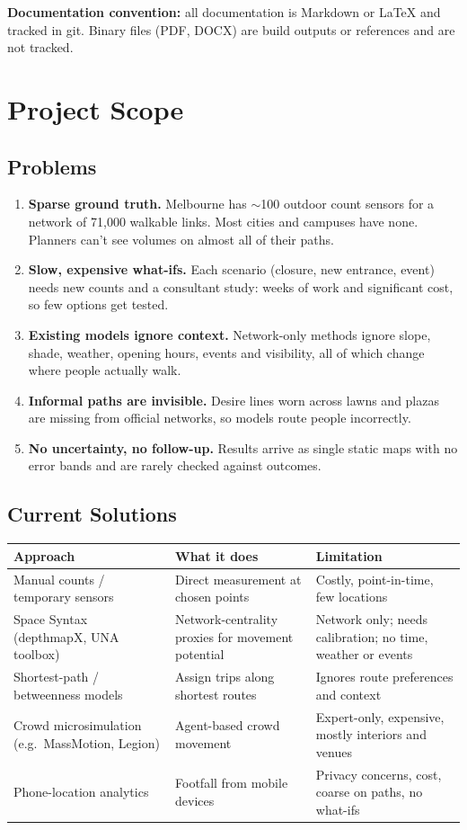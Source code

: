 \documentclass[11pt]{article}
\newcommand{\hrow}{\rowcolor{headgray}}
\begin{document}
\textbf{Documentation convention:} all documentation is Markdown or LaTeX and tracked in git. Binary files (PDF, DOCX) are build outputs or references and are not tracked.

\section{Project Scope}

\subsection{Problems}
\begin{enumerate}
  \item \textbf{Sparse ground truth.} Melbourne has $\sim$100 outdoor count sensors for a network of 71,000 walkable links. Most cities and campuses have none. Planners can't see volumes on almost all of their paths.
  \item \textbf{Slow, expensive what-ifs.} Each scenario (closure, new entrance, event) needs new counts and a consultant study: weeks of work and significant cost, so few options get tested.
  \item \textbf{Existing models ignore context.} Network-only methods ignore slope, shade, weather, opening hours, events and visibility, all of which change where people actually walk.
  \item \textbf{Informal paths are invisible.} Desire lines worn across lawns and plazas are missing from official networks, so models route people incorrectly.
  \item \textbf{No uncertainty, no follow-up.} Results arrive as single static maps with no error bands and are rarely checked against outcomes.
\end{enumerate}

\subsection{Current Solutions}

\begin{xltabular}{\linewidth}{|L{3.8cm}|Y|Y|}
\hline\hrow
\textbf{Approach} & \textbf{What it does} & \textbf{Limitation} \\\hline
\endhead
Manual counts / temporary sensors & Direct measurement at chosen points & Costly, point-in-time, few locations \\\hline
Space Syntax (depthmapX, UNA toolbox) & Network-centrality proxies for movement potential & Network only; needs calibration; no time, weather or events \\\hline
Shortest-path / betweenness models & Assign trips along shortest routes & Ignores route preferences and context \\\hline
Crowd microsimulation (e.g.\ MassMotion, Legion) & Agent-based crowd movement & Expert-only, expensive, mostly interiors and venues \\\hline
Phone-location analytics & Footfall from mobile devices & Privacy concerns, cost, coarse on paths, no what-ifs \\\hline
\end{xltabular}
\end{document}
